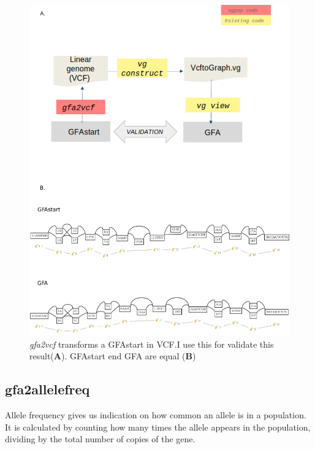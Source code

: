 \begin{figure}[H]
\centering
\includegraphics[width=1.00 \textwidth]{fig/validationgfa2.vcf.png}
\decoRule
\caption{\textit{gfa2vcf} transforms a GFAstart in VCF.I use this for validate this result(\textbf{A}). GFAstart end GFA are equal (\textbf{B})}
\label{fig:validationgraph.png}
\end{figure}


\subsection{gfa2allelefreq} 

Allele frequency gives us indication on how common an allele is in a population. It is calculated by counting how many times the allele appears in the population, dividing by the total number of copies of the gene.

